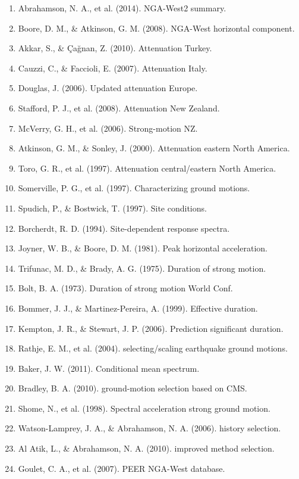 \documentclass[12pt,a4paper]{article}
\begin{document}
\begin{enumerate}
    \item Abrahamson, N. A., et al. (2014). NGA-West2 summary.
    \item Boore, D. M., \& Atkinson, G. M. (2008). NGA-West horizontal component.
    \item Akkar, S., \& Çağnan, Z. (2010). Attenuation Turkey.
    \item Cauzzi, C., \& Faccioli, E. (2007). Attenuation Italy.
    \item Douglas, J. (2006). Updated attenuation Europe.
    \item Stafford, P. J., et al. (2008). Attenuation New Zealand.
    \item McVerry, G. H., et al. (2006). Strong-motion NZ.
    \item Atkinson, G. M., \& Sonley, J. (2000). Attenuation eastern North America.
    \item Toro, G. R., et al. (1997). Attenuation central/eastern North America.
    \item Somerville, P. G., et al. (1997). Characterizing ground motions.
    \item Spudich, P., \& Bostwick, T. (1997). Site conditions.
    \item Borcherdt, R. D. (1994). Site-dependent response spectra.
    \item Joyner, W. B., \& Boore, D. M. (1981). Peak horizontal acceleration.
    \item Trifunac, M. D., \& Brady, A. G. (1975). Duration of strong motion.
    \item Bolt, B. A. (1973). Duration of strong motion World Conf.
    \item Bommer, J. J., \& Martinez-Pereira, A. (1999). Effective duration.
    \item Kempton, J. R., \& Stewart, J. P. (2006). Prediction significant duration.
    \item Rathje, E. M., et al. (2004). selecting/scaling earthquake ground motions.
    \item Baker, J. W. (2011). Conditional mean spectrum.
    \item Bradley, B. A. (2010). ground-motion selection based on CMS.
    \item Shome, N., et al. (1998). Spectral acceleration strong ground motion.
    \item Watson-Lamprey, J. A., \& Abrahamson, N. A. (2006). history selection.
    \item Al Atik, L., \& Abrahamson, N. A. (2010). improved method selection.
    \item Goulet, C. A., et al. (2007). PEER NGA-West database.

\end{enumerate}
\end{document}
